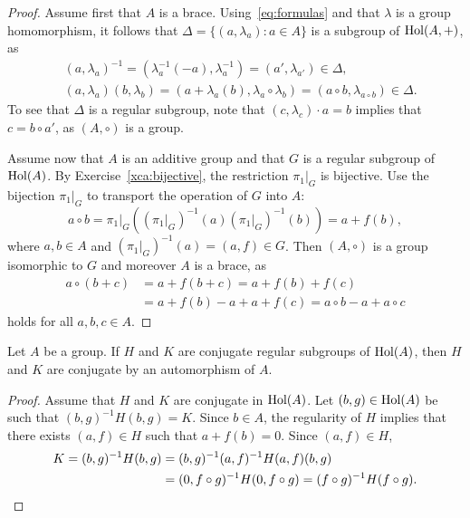 \begin{proof}
    Assume first that $A$ is a brace. 
    Using~\eqref{eq:formulas} and that 
    $\lambda$ is a group homomorphism, it follows that
    $\Delta=\{(a,\lambda_a):a\in A\}$ is a subgroup of $\operatorname{Hol}(A,+)$, as 
    \begin{align*}
    &(a,\lambda_a)^{-1}=(\lambda^{-1}_a(-a),\lambda^{-1}_a)=(a',\lambda_{a'})\in\Delta,\\
    &(a,\lambda_a)(b,\lambda_b)=(a+\lambda_a(b),\lambda_a\circ\lambda_b)=(a\circ b,\lambda_{a\circ b})\in\Delta.    
    \end{align*}
    To see that $\Delta$ is a regular subgroup, note that $(c,\lambda_c)\cdot a=b$ 
    implies that $c=b\circ a'$, as $(A,\circ)$ is a group. 

	Assume now that $A$ is an additive group and that 
	$G$ is a regular subgroup of $\operatorname{Hol}(A)$. By Exercise~\ref{xca:bijective}, the restriction 
	$\pi_1|_G$ is bijective.  Use the bijection $\pi_1|_G$ to transport the
	operation of $G$ into $A$: 
	\[
        a\circ b=\pi_1|_G\left((\pi_1|_G)^{-1}(a)(\pi_1|_G)^{-1}(b)\right)=a+f(b),
	\]
	where $a,b\in A$ and $(\pi_1|_G)^{-1}(a)=(a,f)\in G$. 
	Then $(A,\circ)$ is a group isomorphic to $G$ and moreover $A$ is a brace, as 
	\begin{align*}
		a\circ (b+c)&=a+f(b+c)=a+f(b)+f(c)\\
		&=a+f(b)-a+a+f(c)=a\circ b-a+a\circ c
	\end{align*}
	holds for all $a,b,c\in A$. 
\end{proof}


\begin{lemma}
\label{lem:BNY}
	Let $A$ be a group. If $H$ and $K$ are conjugate regular subgroups of
	$\operatorname{Hol}(A)$, then $H$ and $K$ are conjugate by an automorphism of $A$. 
\end{lemma}

\begin{proof}
    Assume that $H$ and $K$ are conjugate in $\operatorname{Hol}(A)$. Let $(b,g)\in\operatorname{Hol}(A)$ be such that $(b,g)^{-1}H(b,g)=K$. 
    Since $b\in A$, the regularity of $H$ implies that
    there exists $(a,f)\in H$ such that $a+f(b)=0$. Since $(a,f)\in H$, 
    \begin{align*}
    K=(b,g)^{-1}H(b,g)&=(b,g)^{-1}(a,f)^{-1}H(a,f)(b,g)\\
    &=(0,f\circ g)^{-1}H(0,f\circ g)=(f\circ g)^{-1}H(f\circ g).\qedhere
    \end{align*}
\end{proof}

